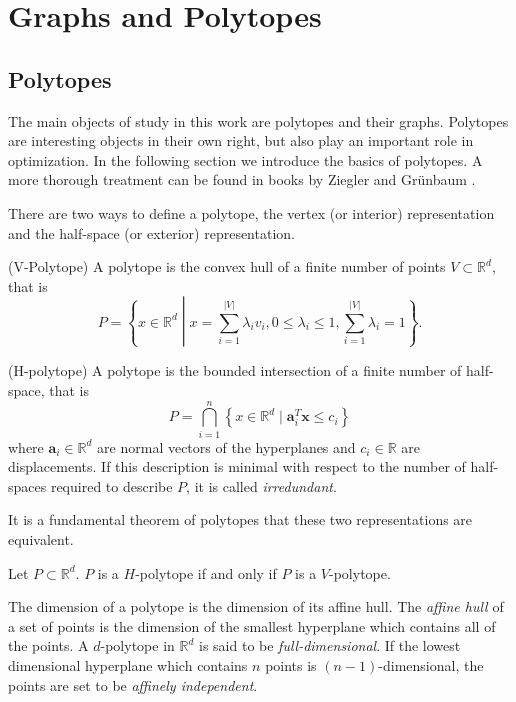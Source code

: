 \chapter{Graphs and Polytopes}
\label{mathchapter}

\section{Polytopes}

The main objects of study in this work are polytopes and their graphs. Polytopes are 
interesting 
objects in their own right, but also play an important role in
optimization. In the following section we introduce the basics of polytopes. 
A more thorough treatment can be found in books by Ziegler \cite{PolyLec} 
and Gr\"unbaum \cite{Grunbaum69convexpolytopes}. 

There are 
two ways to define a polytope, the vertex (or interior) representation and the 
half-space (or exterior) representation.

\begin{definition}
(V-Polytope) A polytope is the convex hull of a finite number of points $V 
\subset \mathbb{R}^d$, that is 
\begin{equation}
 P = \left\{x\in \mathbb{R}^d \middle| x = \sum_{i=1}^{|V|} \lambda_i v_i, 
0\leq \lambda_i \leq 1, \sum_{i=1}^{|V|} \lambda_i = 1 \right\}.
\end{equation}

\end{definition}

\begin{definition}
 (H-polytope) A polytope is the bounded intersection of a finite number of 
half-space, that is
\begin{equation}
 P = \bigcap_{i=1}^n \left\{x \in \mathbb{R}^d \mid \mathbf{a}_i^T \mathbf{x} 
\leq 
c_i \right\}
\end{equation}
where $\mathbf{a}_i \in \mathbb{R}^d$ are normal vectors of the hyperplanes and 
$c_i \in 
\mathbb{R}$ are displacements. If this description is minimal with respect to 
the number of half-spaces required to describe $P$, it is called 
\textit{irredundant}.
\end{definition}

It is a fundamental theorem of polytopes that these two representations are 
equivalent.
\begin{theorem} Let $P \subset \mathbb{R}^d$. 
$P$ is a $H$-polytope if and only if $P$ is a $V$-polytope.
\end{theorem}
The dimension of a polytope is the dimension of its affine hull. The \textit{affine 
hull} of a set of points is the dimension of the smallest hyperplane which 
contains all of the points. A $d$-polytope in $\mathbb{R}^d$ is said to be 
\textit{full-dimensional}. If the lowest dimensional hyperplane which contains 
$n$ points is $(n-1)$-dimensional, the points are set to be \textit{affinely 
independent}.

